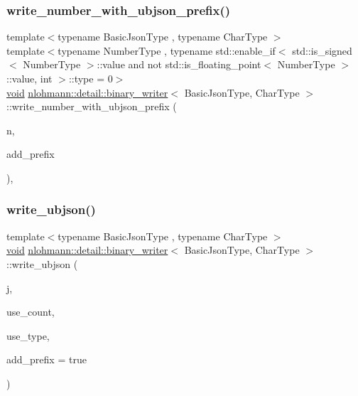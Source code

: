 \subsubsection{\texorpdfstring{write\_number\_with\_ubjson\_prefix()}{write\_number\_with\_ubjson\_prefix()}\hspace{0.1cm}{\footnotesize\ttfamily [3/3]}}
{\footnotesize\ttfamily template$<$typename Basic\+Json\+Type , typename Char\+Type $>$ \\
template$<$typename Number\+Type , typename std\+::enable\+\_\+if$<$ std\+::is\+\_\+signed$<$ Number\+Type $>$\+::value and not std\+::is\+\_\+floating\+\_\+point$<$ Number\+Type $>$\+::value, int $>$\+::type  = 0$>$ \\
\mbox{\hyperlink{namespacenlohmann_1_1detail_a59fca69799f6b9e366710cb9043aa77d}{void}} \mbox{\hyperlink{classnlohmann_1_1detail_1_1binary__writer}{nlohmann\+::detail\+::binary\+\_\+writer}}$<$ Basic\+Json\+Type, Char\+Type $>$\+::write\+\_\+number\+\_\+with\+\_\+ubjson\+\_\+prefix (\begin{DoxyParamCaption}\item[{const Number\+Type}]{n,  }\item[{const bool}]{add\+\_\+prefix }\end{DoxyParamCaption})\hspace{0.3cm}{\ttfamily [inline]}, {\ttfamily [private]}}

\mbox{\label{classnlohmann_1_1detail_1_1binary__writer_a0f6c65053d859269f88eb4ebb0cd7060}} 
\subsubsection{\texorpdfstring{write\_ubjson()}{write\_ubjson()}}
{\footnotesize\ttfamily template$<$typename Basic\+Json\+Type , typename Char\+Type $>$ \\
\mbox{\hyperlink{namespacenlohmann_1_1detail_a59fca69799f6b9e366710cb9043aa77d}{void}} \mbox{\hyperlink{classnlohmann_1_1detail_1_1binary__writer}{nlohmann\+::detail\+::binary\+\_\+writer}}$<$ Basic\+Json\+Type, Char\+Type $>$\+::write\+\_\+ubjson (\begin{DoxyParamCaption}\item[{const Basic\+Json\+Type \&}]{j,  }\item[{const bool}]{use\+\_\+count,  }\item[{const bool}]{use\+\_\+type,  }\item[{const bool}]{add\+\_\+prefix = {\ttfamily true} }\end{DoxyParamCaption})\hspace{0.3cm}{\ttfamily [inline]}}


